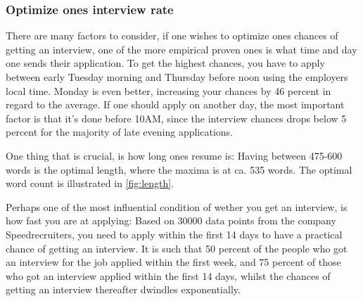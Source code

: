 \subsubsection{Optimize ones interview rate}
There are many factors to consider, if one wishes to optimize ones
chances of getting an interview, one of the more empirical proven ones
is what time and day one sends their application.
To get the highest chances, you have to apply between early Tuesday morning
and Thursday before noon using the employers local time. Monday is even better,
increasing your chances by 46 percent in regard to the average.
If one should apply on another day, the most important factor is that
it's done before 10AM, since the interview chances drops below 5 percent for
the majority of late evening applications.\cite{Best_time_and_date}

One thing that is crucial, is how long ones resume is:
Having between 475-600 words is the optimal length, where the maxima is at
ca. 535 words. The optimal word count is illustrated in \vref{fig:length}.

Perhaps one of the most influential condition of wether you get an interview,
is how fast you are at applying:
Based on 30000 data points from the company Speedrecruiters, you need
to apply within the first 14 days to have a practical chance of getting an
interview. It is such that 50 percent of the people who got an interview
for the job applied within the first week, and 75 percent of those who
got an interview applied within the first 14 days, whilst the chances of
getting an interview thereafter dwindles exponentially.\cite{Best_time_and_dateV2}

